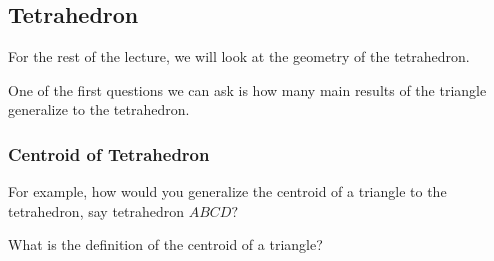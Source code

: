 \subsection{Tetrahedron}
For the rest of the lecture, we will look at the geometry of the tetrahedron.

One of the first questions we can ask is how many main results of the triangle generalize to the tetrahedron.

\subsubsection{Centroid of Tetrahedron}
For example, how would you generalize the centroid of a triangle to the tetrahedron, say tetrahedron $ABCD?$

What is the definition of the centroid of a triangle?













